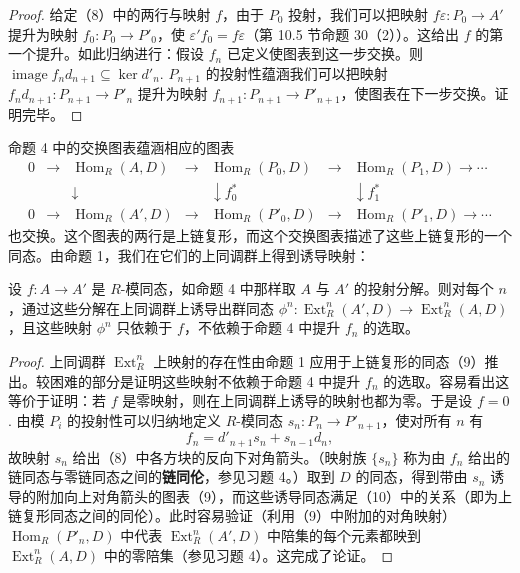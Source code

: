 \begin{proof}
给定（8）中的两行与映射 \(f\)，由于 \(P_0\) 投射，我们可以把映射 \(f\varepsilon : P_0 \to A'\) 提升为映射 \(f_0 : P_0 \to P'_0\)，使 \(\varepsilon' f_0 = f\varepsilon\)（第 10.5 节命题 30（2））。这给出 \(f\) 的第一个提升。如此归纳进行：假设 \(f_n\) 已定义使图表到这一步交换。则 \(\operatorname{image}f_nd_{n+1} \subseteq \ker d'_n\). \(P_{n+1}\) 的投射性蕴涵我们可以把映射 \(f_nd_{n+1} : P_{n+1} \to P'_n\) 提升为映射 \(f_{n+1} : P_{n+1} \to P'_{n+1}\)，使图表在下一步交换。证明完毕。
\end{proof}

命题 4 中的交换图表蕴涵相应的图表
\[
\begin{array}{ccccccc}
0 & \to & \operatorname{Hom}_R(A, D) & \to & \operatorname{Hom}_R(P_0, D) & \to & \operatorname{Hom}_R(P_1, D) \to \cdots\\
& & \downarrow & & \downarrow f_0^* & & \downarrow f_1^*\\
0 & \to & \operatorname{Hom}_R(A', D) & \to & \operatorname{Hom}_R(P'_0, D) & \to & \operatorname{Hom}_R(P'_1, D) \to \cdots
\end{array} \tag{17.9}
\]
也交换。这个图表的两行是上链复形，而这个交换图表描述了这些上链复形的一个同态。由命题 1，我们在它们的上同调群上得到诱导映射：

\begin{proposition}\label{pro:17.5}
设 \(f : A \to A'\) 是 \(R\)-模同态，如命题 4 中那样取 \(A\) 与 \(A'\) 的投射分解。则对每个 \(n\)，通过这些分解在上同调群上诱导出群同态 \(\phi^n : \operatorname{Ext}_R^n(A', D) \to \operatorname{Ext}_R^n(A, D)\)，且这些映射 \(\phi^n\) 只依赖于 \(f\)，不依赖于命题 4 中提升 \(f_n\) 的选取。
\end{proposition}

\begin{proof}
上同调群 \(\operatorname{Ext}_R^n\) 上映射的存在性由命题 1 应用于上链复形的同态（9）推出。较困难的部分是证明这些映射不依赖于命题 4 中提升 \(f_n\) 的选取。容易看出这等价于证明：若 \(f\) 是零映射，则在上同调群上诱导的映射也都为零。于是设 \(f = 0\). 由模 \(P_i\) 的投射性可以归纳地定义 \(R\)-模同态 \(s_n : P_n \to P'_{n+1}\)，使对所有 \(n\) 有
\[
f_n = d'_{n+1}s_n+s_{n-1}d_n, \tag{17.10}
\]
故映射 \(s_n\) 给出（8）中各方块的反向下对角箭头。（映射族 \(\{s_n\}\) 称为由 \(f_n\) 给出的链同态与零链同态之间的\textbf{链同伦}，参见习题 4。）取到 \(D\) 的同态，得到带由 \(s_n\) 诱导的附加向上对角箭头的图表（9），而这些诱导同态满足（10）中的关系（即为上链复形同态之间的同伦）。此时容易验证（利用（9）中附加的对角映射）\(\operatorname{Hom}_R(P'_n, D)\) 中代表 \(\operatorname{Ext}_R^n(A', D)\) 中陪集的每个元素都映到 \(\operatorname{Ext}_R^n(A, D)\) 中的零陪集（参见习题 4）。这完成了论证。
\end{proof}

